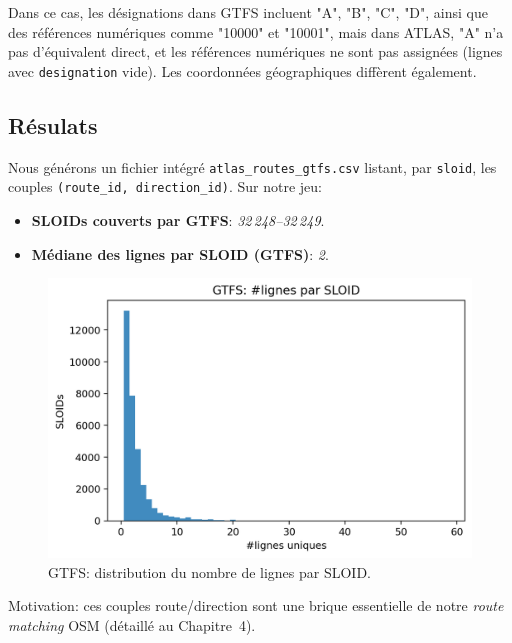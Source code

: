 Dans ce cas, les désignations dans GTFS incluent "A", "B", "C", "D", ainsi que des références numériques comme "10000" et "10001", mais dans ATLAS,  "A" n’a pas d’équivalent direct, et les références numériques ne sont pas assignées (lignes avec \texttt{designation} vide). Les coordonnées géographiques diffèrent également.

\subsection{Résulats}
Nous générons un fichier intégré \texttt{atlas\_routes\_gtfs.csv} listant, par \texttt{sloid}, les couples \texttt{(route\_id, direction\_id)}. Sur notre jeu:
\begin{itemize}
  \item \textbf{SLOIDs couverts par GTFS}: \textit{32\,248--32\,249}.
  \item \textbf{Médiane des lignes par SLOID (GTFS)}: \textit{2}.
\end{itemize}

\begin{figure}[h]
  \centering
  \includegraphics[width=.7\linewidth]{figures/plots/gtfs_routes_per_sloid.png}
  \caption[GTFS: lignes par SLOID]{GTFS: distribution du nombre de lignes par SLOID.}
  \label{fig:gtfs_lines_per_sloid}
\end{figure}

\noindent
Motivation: ces couples route/direction sont une brique essentielle de notre \textit{route matching} OSM (détaillé au Chapitre~4).


